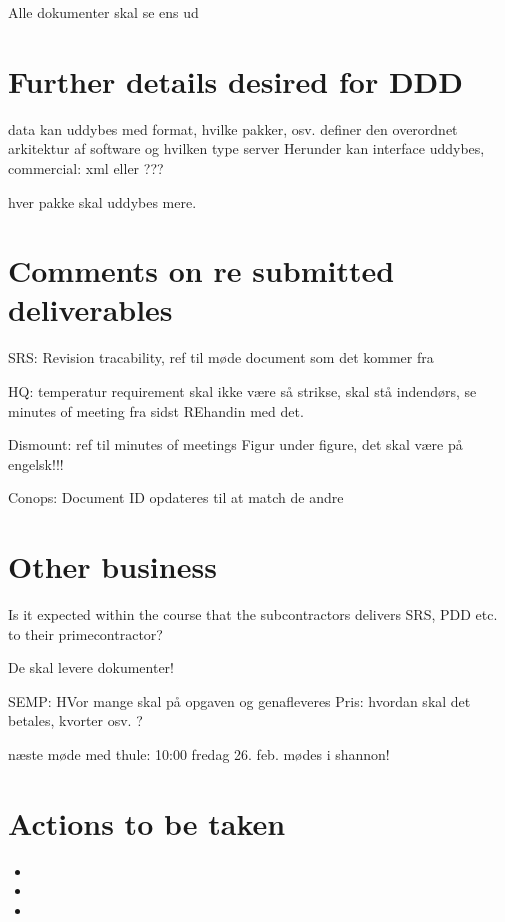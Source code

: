 Alle dokumenter skal se ens ud

\section*{Further details desired for DDD}
data kan uddybes med format, hvilke pakker, osv.
definer den overordnet arkitektur af software og hvilken type server
Herunder kan interface uddybes, commercial: xml eller ???

hver pakke skal uddybes mere.


\section*{Comments on re submitted deliverables}

SRS:
Revision tracability, ref til møde document som det kommer fra

HQ: temperatur requirement skal ikke være så strikse, skal stå indendørs, se minutes of meeting fra sidst
REhandin med det.

Dismount:
ref til minutes of meetings
Figur under figure, det skal være på engelsk!!!


Conops:
Document ID opdateres til at match de andre



\section*{Other business}
Is it expected within the course that the subcontractors delivers SRS, PDD etc. to their primecontractor?

De skal levere dokumenter!


SEMP:
HVor mange skal på opgaven og genafleveres
Pris: hvordan skal det betales, kvorter osv. ?


næste møde med thule:
10:00 fredag 26. feb. mødes i shannon!


\section*{Actions to be taken}
\begin{itemize}
    \item 
    \item 
    \item 
\end{itemize}
